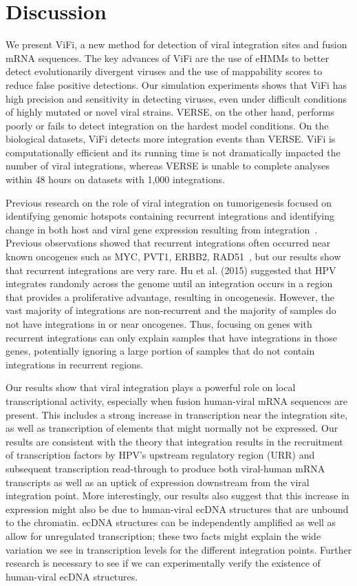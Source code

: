 \documentclass[11pt]{article}
\begin{document}
\section*{Discussion}
We present ViFi, a new method for detection of viral integration sites
and fusion mRNA sequences.  The key advances of ViFi are the use of
eHMMs to better detect evolutionarily divergent viruses and the use of
mappability scores to reduce false positive detections.  Our
simulation experiments shows that ViFi has high precision and
sensitivity in detecting viruses, even under difficult conditions of
highly mutated or novel viral strains.  VERSE, on the other hand,
performs poorly or fails to detect integration on the hardest model
conditions.  On the biological datasets, ViFi detects more integration
events than VERSE.  ViFi is computationally efficient and its running
time is not dramatically impacted the number of viral integrations,
whereas VERSE is unable to complete analyses within 48 hours on
datasets with 1,000 integrations.

Previous research on the role of viral integration on tumorigenesis
focused on identifying genomic hotspots containing recurrent
integrations and identifying change in both host and viral gene
expression resulting from
integration~\cite{Sung2012,Tang2013,Lawrence2015,Hu2015,Zhang2016}.  Previous
observations showed that recurrent integrations often occurred near
known oncogenes such as MYC, PVT1, ERBB2, RAD51~\cite{Tang2013}, but
our results show that recurrent integrations are very rare.  Hu et
al. (2015) suggested that HPV integrates randomly across the genome
until an integration occurs in a region that provides a proliferative
advantage, resulting in oncogenesis.  However, the vast majority of
integrations are non-recurrent and the majority of samples do not have
integrations in or near oncogenes.  Thus, focusing on genes with
recurrent integrations can only explain samples that have integrations
in those genes, potentially ignoring a large portion of samples that
do not contain integrations in recurrent regions.

Our results show that viral integration plays a powerful role on local
transcriptional activity, especially when fusion human-viral mRNA
sequences are present.  This includes a strong increase in
transcription near the integration site, as well as transcription of
elements that might normally not be expressed.  Our results are
consistent with the theory that integration results in the recruitment
of transcription factors by HPV's upstream regulatory region (URR) and
subsequent transcription read-through to produce both viral-human mRNA
transcripts as well as an uptick of expression downstream from the
viral integration point.  More interestingly, our results also suggest
that this increase in expression might also be due to human-viral
ecDNA structures that are unbound to the chromatin.  ecDNA structures
can be independently amplified as well as allow for unregulated
transcription; these two facts might explain the wide variation we see
in transcription levels for the different integration points.  Further
research is necessary to see if we can experimentally verify the
existence of human-viral ecDNA structures.
\end{document}
